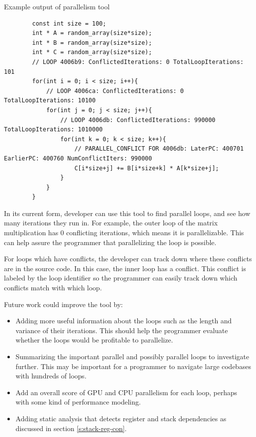 \documentclass[12pt,twoside]{reedthesis}
\newenvironment{codeexample}[1][htb]
{\floatname{algorithm}{Code Example}%
	\begin{algorithm}[#1]%
	}{\end{algorithm}}
\begin{document}
		\begin{codeexample}
			\caption{Example output of parallelism tool}
			\label{ce:par-tool-output}
		\begin{verbatim}
		const int size = 100;
		int * A = random_array(size*size);
		int * B = random_array(size*size);
		int * C = random_array(size*size);
		// LOOP 4006b9: ConflictedIterations: 0 TotalLoopIterations: 101
		for(int i = 0; i < size; i++){
		    // LOOP 4006ca: ConflictedIterations: 0 TotalLoopIterations: 10100 
		    for(int j = 0; j < size; j++){
		        // LOOP 4006db: ConflictedIterations: 990000 TotalLoopIterations: 1010000
		        for(int k = 0; k < size; k++){
		            // PARALLEL_CONFLICT FOR 4006db: LaterPC: 400701 EarlierPC: 400760 NumConflictIters: 990000
		            C[i*size+j] += B[i*size+k] * A[k*size+j];
		        }
		    }
		}
		\end{verbatim}
		\end{codeexample}
	
		In its current form, developer can use this tool to find parallel loops, and see how many iterations they run in. For example, the outer loop of the matrix multiplication has 0 conflicting iterations, which means it is parallelizable. This can help assure the programmer that parallelizing the loop is possible. 
		
		For loops which have conflicts, the developer can track down where these conflicts are in the source code. In this case, the inner loop has a conflict. This conflict is labeled by the loop identifier so the programmer can easily track down which conflicts match with which loop. %
		 
		Future work could improve the tool by:
		
		\begin{itemize}
			\item Adding more useful information about the loops such as the length and variance of their iterations. This should help the programmer evaluate whether the loops would be profitable to parallelize.
			\item Summarizing the important parallel and possibly parallel loops to investigate further. This may be important for a programmer to navigate large codebases with hundreds of loops. 
			\item  Add an overall score of GPU and CPU parallelism for each loop, perhaps with some kind of performance modeling. 
			\item  Adding static analysis that detects register and stack dependencies as discussed in  section \ref{s:stack-reg-con}.
		\end{itemize} 
	
\end{document}
